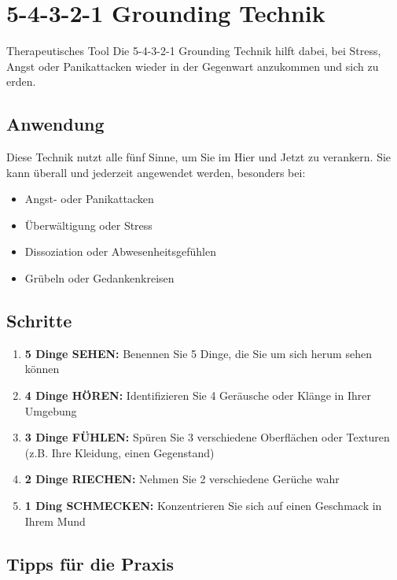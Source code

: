 
\section{5-4-3-2-1 Grounding Technik}

\begin{ctmmGreenBox}{Therapeutisches Tool}
    Die 5-4-3-2-1 Grounding Technik hilft dabei, bei Stress, Angst oder Panikattacken wieder in der Gegenwart anzukommen und sich zu erden.
\end{ctmmGreenBox}

\subsection{Anwendung}

Diese Technik nutzt alle fünf Sinne, um Sie im Hier und Jetzt zu verankern. Sie kann überall und jederzeit angewendet werden, besonders bei:
\begin{itemize}
    \item Angst- oder Panikattacken
    \item Überwältigung oder Stress
    \item Dissoziation oder Abwesenheitsgefühlen
    \item Grübeln oder Gedankenkreisen
\end{itemize}

\subsection{Schritte}

\begin{enumerate}
    \item \textbf{5 Dinge SEHEN:} Benennen Sie 5 Dinge, die Sie um sich herum sehen können
    \item \textbf{4 Dinge HÖREN:} Identifizieren Sie 4 Geräusche oder Klänge in Ihrer Umgebung
    \item \textbf{3 Dinge FÜHLEN:} Spüren Sie 3 verschiedene Oberflächen oder Texturen (z.B. Ihre Kleidung, einen Gegenstand)
    \item \textbf{2 Dinge RIECHEN:} Nehmen Sie 2 verschiedene Gerüche wahr
    \item \textbf{1 Ding SCHMECKEN:} Konzentrieren Sie sich auf einen Geschmack in Ihrem Mund
\end{enumerate}

\subsection{Tipps für die Praxis}

